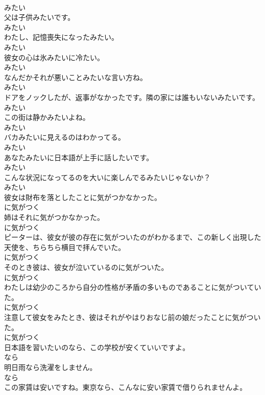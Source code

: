 \documentclass[8pt]{extreport}
\begin{document}
\begin{CJK}{UTF8}{min}
\\	みたい
\\	父は子供みたいです。	
\\	みたい
\\	わたし、記憶喪失になったみたい。	
\\	みたい
\\	彼女の心は氷みたいに冷たい。	
\\	みたい
\\	なんだかそれが悪いことみたいな言い方ね。	
\\	みたい
\\	ドアをノックしたが、返事がなかったです。隣の家には誰もいないみたいです。	
\\	みたい
\\	この街は静かみたいよね。	
\\	みたい
\\	バカみたいに見えるのはわかってる。	
\\	みたい
\\	あなたみたいに日本語が上手に話したいです。	
\\	みたい
\\	こんな状況になってるのを大いに楽しんでるみたいじゃないか？	
\\	みたい
\\	彼女は財布を落としたことに気がつかなかった。	
\\	に気がつく
\\	姉はそれに気がつかなかった。	
\\	に気がつく
\\	ピーターは、彼女が彼の存在に気がついたのがわかるまで、この新しく出現した天使を、ちらちら横目で拝んでいた。	
\\	に気がつく
\\	そのとき彼は、彼女が泣いているのに気がついた。	
\\	に気がつく
\\	わたしは幼少のころから自分の性格が矛盾の多いものであることに気がついていた。	
\\	に気がつく
\\	注意して彼女をみたとき、彼はそれがやはりおなじ前の娘だったことに気がついた。	
\\	に気がつく
\\	日本語を習いたいのなら、この学校が安くていいですよ。	
\\	なら
\\	明日雨なら洗濯をしません。	
\\	なら
\\	この家賃は安いですね。東京なら、こんなに安い家賃で借りられませんよ。	

\end{CJK}
\end{document}
